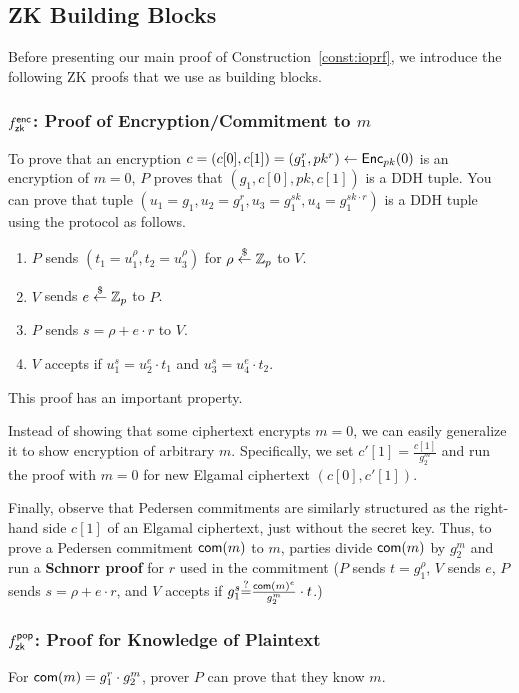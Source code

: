 \subsection{ZK Building Blocks}
Before presenting our main proof of Construction~\ref{const:ioprf}, we
introduce the following ZK proofs that we use as building blocks.

\subsubsection{${f^{\mathsf{enc}}_{\mathsf{zk}}}$: Proof of Encryption/Commitment to $m$}
\label{poe}
To prove that an encryption
$c=(c[0],c[1])=(g_1^r,pk^r)\leftarrow{\mathsf{Enc}}_{pk}(0)$ is an encryption of
$m=0$, $P$ proves that $(g_1,c[0],pk,c[1])$ is a DDH tuple.  You can
prove that tuple
$(u_1=g_1,u_2=g_1^r,u_3=g_1^{sk},u_4=g_1^{sk\cdot{}r})$ is a DDH tuple
using the \citet{cp92} protocol as follows.

\begin{enumerate}[leftmargin=*]
\item $P$ sends $(t_1=u_1^{\rho},t_2=u_3^{\rho})$ for $\rho\stackrel{\$}{\leftarrow}\mathbb{Z}_p$ to $V$.
  \item $V$ sends $e\stackrel{\$}{\leftarrow}\mathbb{Z}_p$ to $P$.
  \item $P$ sends $s=\rho+e\cdot{}r$ to $V$.
    \item $V$ accepts if $u_1^s=u_2^e\cdot{}t_1$ and $u_3^s=u_4^e\cdot{}t_2$.
\end{enumerate}

This proof has an important property. Instead of showing that some
ciphertext encrypts $m=0$, we can easily generalize it to show
encryption of arbitrary $m$. Specifically, we set
$c'[1]=\frac{c[1]}{g_2^m}$ and run the proof with $m = 0$ for new Elgamal
ciphertext $(c[0],c'[1])$.

Finally, observe that Pedersen commitments are similarly structured as the
right-hand side $c[1]$ of an Elgamal ciphertext, just without the secret key.
Thus, to prove a
Pedersen commitment $\mathsf{com}(m)$ to $m$, parties divide $\mathsf{com}(m)$ by
$g_2^m$ and run a {\bf Schnorr proof} for $r$ used in the commitment ($P$
sends $t=g_1^\rho$, $V$ sends $e$, $P$ sends $s=\rho+e\cdot{}r$, and $V$
accepts if $g_1^s{\stackrel{?}{=}}\frac{\mathsf{com}(m)^e}{g_2^m}\cdot{}t$.)

\subsubsection{${f^{\mathsf{pop}}_{\mathsf{zk}}}$: Proof for Knowledge of Plaintext }
\label{pokop}
For $\mathsf{com}(m)=g_1^r\cdot{}g_2^m$,  prover $P$ can prove that they know
$m$.

